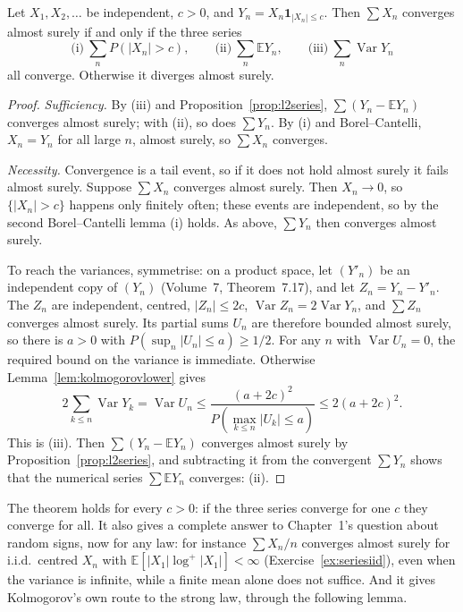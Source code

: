 \begin{theorem}\label{thm:threeseries}
Let $X_1,X_2,\dots$ be independent, $c>0$, and $Y_n=X_n\mathbf 1_{|X_n|\le c}$. Then $\sum X_n$ converges almost surely if and only if the three
series
\[
\text{(i)}\ \sum_nP(|X_n|>c),\qquad\text{(ii)}\ \sum_n\mathbb E Y_n,\qquad\text{(iii)}\ \sum_n\operatorname{Var}Y_n
\]
all converge. Otherwise it diverges almost surely.
\end{theorem}
\begin{proof}
\emph{Sufficiency.} By (iii) and Proposition~\ref{prop:l2series}, $\sum(Y_n-\mathbb E Y_n)$ converges almost surely; with (ii), so does $\sum Y_n$.
By (i) and Borel--Cantelli, $X_n=Y_n$ for all large $n$, almost surely, so $\sum X_n$ converges.

\emph{Necessity.} Convergence is a tail event, so if it does not hold almost surely it fails almost surely. Suppose $\sum X_n$ converges almost surely.
Then $X_n\to0$, so $\{|X_n|>c\}$ happens only finitely often; these events are independent, so by the second Borel--Cantelli lemma (i) holds. As above,
$\sum Y_n$ then converges almost surely.

To reach the variances, symmetrise: on a product space, let $(Y'_n)$ be an independent copy of $(Y_n)$ (Volume~7, Theorem~7.17), and let
$Z_n=Y_n-Y'_n$. The $Z_n$ are independent, centred, $|Z_n|\le2c$, $\operatorname{Var}Z_n=2\operatorname{Var}Y_n$, and $\sum Z_n$ converges almost
surely. Its partial sums $U_n$ are therefore bounded almost surely, so there is $a>0$ with $P(\sup_n|U_n|\le a)\ge1/2$. For any $n$ with $\operatorname{Var}U_n=0$, the required bound on the variance is immediate. Otherwise Lemma~\ref{lem:kolmogorovlower} gives
\[
2\sum_{k\le n}\operatorname{Var}Y_k=\operatorname{Var}U_n\le\frac{(a+2c)^2}{P(\max_{k\le n}|U_k|\le a)}\le2(a+2c)^2.
\]
This is (iii). Then $\sum(Y_n-\mathbb E Y_n)$ converges almost surely by Proposition~\ref{prop:l2series}, and subtracting it from the convergent
$\sum Y_n$ shows that the numerical series $\sum\mathbb E Y_n$ converges: (ii).
\end{proof}

The theorem holds for every $c>0$: if the three series converge for one $c$ they converge for all. It also gives a complete answer to Chapter~1's
question about random signs, now for any law: for instance $\sum X_n/n$ converges almost surely for i.i.d.\ centred $X_n$ with $\mathbb E[|X_1|\log^+|X_1|]<\infty$
(Exercise~\ref{ex:seriesiid}), even when the variance is infinite, while a finite mean alone does not suffice. And it gives Kolmogorov's own route to the strong law, through the following lemma.

